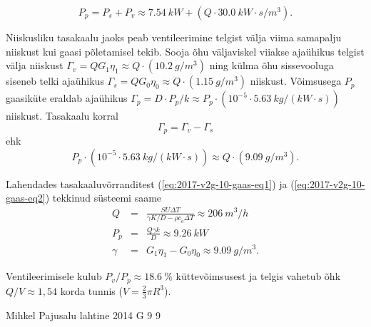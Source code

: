 \documentclass[11pt, twoside]{article}
\begin{document}
{{\begin{equation}
P_{p}=P_{s}+P_{v}\approx\SI{7.54}{kW}+\left(Q\cdot\SI{30.0}{kW\cdot s/m^{3}}\right).\label{eq:2017-v2g-10-gaas-eq1}
\end{equation}


Niiskusliku tasakaalu jaoks peab ventileerimine telgist välja viima
samapalju niiskust kui gaasi põletamisel tekib. Sooja õhu väljaviskel
viiakse ajaühikus telgist välja niiskust $\Gamma_{v}=QG_{1}\eta_{1}\approx Q\cdot\left(\SI{10.2}{g/m^{3}}\right)$
ning külma õhu sissevooluga siseneb telki ajaühikus $\Gamma_{s}=QG_{0}\eta_{0}\approx Q\cdot\left(\SI{1.15}{g/m^{3}}\right)$
niiskust. Võimsusega $P_{p}$ gaasiküte eraldab ajaühikus
$\Gamma_{p}=D\cdot P_{p}/k\approx P_{p}\cdot\left(10^{-5}\cdot\SI{5.63}{kg/\left(kW\cdot s\right)}\right)$
niiskust. Tasakaalu korral
\vspace{-3pt}
\[
\Gamma_{p}=\Gamma_{v}-\Gamma_{s}
\]
\vspace{-3pt}
\noindent ehk
\vspace{-3pt}
\begin{equation}
P_{p}\cdot\left(10^{-5}\cdot\SI{5.63}{kg/\left(kW\cdot s\right)}\right)\approx Q\cdot\left(\SI{9.09}{g/m^{3}}\right).\label{eq:2017-v2g-10-gaas-eq2}
\end{equation}


Lahendades tasakaaluvõrranditest (\ref{eq:2017-v2g-10-gaas-eq1}) ja (\ref{eq:2017-v2g-10-gaas-eq2})
tekkinud süsteemi saame
\vspace{-3pt}
\begin{eqnarray*}
	Q & = & \frac{SU\Delta T}{\gamma K/D-\rho c_{\tilde{o}}\Delta T}\approx\SI{206}{m^{3}/h}\\
	P_{p} & = & \frac{Q\gamma k}{D}\approx\SI{9.26}{kW}\\
	\gamma & = & G_{1}\eta_{1}-G_{0}\eta_{0}\approx\SI{9.09}{g/m^{3}}.
\end{eqnarray*}


Ventileerimisele kulub $P_{v}/P_{p}\approx\SI{18.6}{\percent}$ küttevõimsusest
ja telgis vahetub õhk $Q/V\approx1,54$ korda tunnis ($V=\frac{2}{3}\pi R^{3}$).
\fi
}

{Mihkel Pajusalu} %
{lahtine} %
{2014} %
{G 9} %
{9} %
{

}}
\end{document}
